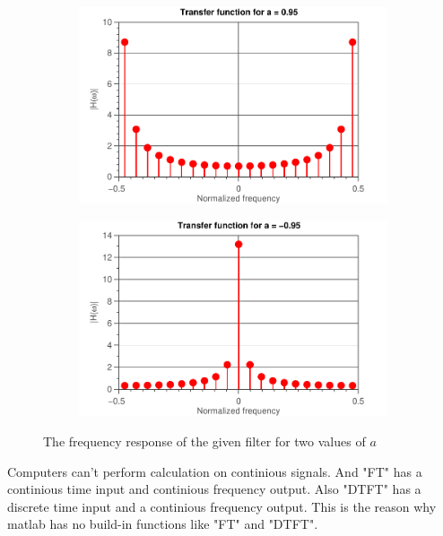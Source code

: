 \documentclass[11pt,titlepage]{report}
\begin{document}
\begin{figure}[H]
	\centering
	\begin{subfigure}{0.49\textwidth}
		\includegraphics[width=\textwidth]{../../deliverable-7-resources/figures/ass-1/report-2/ass-1-report-2-a-positive-spectrum.pdf}
	\end{subfigure}
	\begin{subfigure}{0.49\textwidth}
		\includegraphics[width=\textwidth]{../../deliverable-7-resources/figures/ass-1/report-2/ass-1-report-2-a-negative-spectrum.pdf}
	\end{subfigure}
	\caption{The frequency response of the given filter for two values of $a$}
	\label{fig:rep2-freq-resp}
\end{figure}

Computers can't perform calculation on continious signals. And "FT" has a continious time input and continious frequency output. Also "DTFT" has a discrete time input and a continious frequency output. This is the reason why matlab has no build-in functions like "FT" and "DTFT". 
\end{document}
